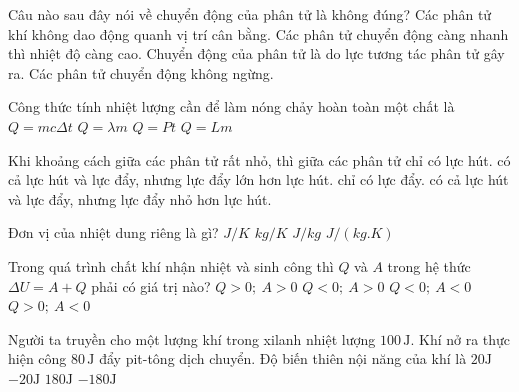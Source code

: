 \begin{ex}
Câu nào sau đây nói về chuyển động của phân tử là không đúng?
\choice
{Các phân tử khí không dao động quanh vị trí cân bằng.}
{Các phân tử chuyển động càng nhanh thì nhiệt độ càng cao.}
{\True Chuyển động của phân tử là do lực tương tác phân tử gây ra.}
{Các phân tử chuyển động không ngừng.}
\end{ex}

\begin{ex}
Công thức tính nhiệt lượng cần để làm nóng chảy hoàn toàn một chất là
\choice
{$Q=mc\Delta t$}
{\True $Q=\lambda m$}
{$Q=Pt$}
{$Q=Lm$}
\loigiai{\[Q=\lambda m.\]}
\end{ex}

\begin{ex}
Khi khoảng cách giữa các phân tử rất nhỏ, thì giữa các phân tử
\choice
{chỉ có lực hút.}
{\True có cả lực hút và lực đẩy, nhưng lực đẩy lớn hơn lực hút.}
{chỉ có lực đẩy.}
{có cả lực hút và lực đẩy, nhưng lực đẩy nhỏ hơn lực hút.}
\end{ex}

\begin{ex}Đơn vị của nhiệt dung riêng là gì?
\choice
{$J/K$}
{$kg/K$}
{$J/kg$}
{\True $J/(kg.K)$}
\end{ex}

\begin{ex}
Trong quá trình chất khí nhận nhiệt và sinh công thì $Q$ và $A$ trong hệ thức $\Delta U=A+Q$ phải có giá trị nào?
\choice
{$Q>0;\ A>0$}
{$Q<0;\ A>0$}
{$Q<0;\ A<0$}
{\True $Q>0;\ A<0$}
\end{ex}

\begin{ex}Người ta truyền cho một lượng khí trong xilanh nhiệt lượng $100\,\mathrm{J}$. Khí nở ra thực hiện công $80\,\mathrm{J}$ đẩy pit-tông dịch chuyển. Độ biến thiên nội năng của khí là
\choice
{\True $20 \mathrm{J}$}
{$-20 \mathrm{J}$}
{$180 \mathrm{J}$}
{$-180 \mathrm{J}$}
\end{ex}

